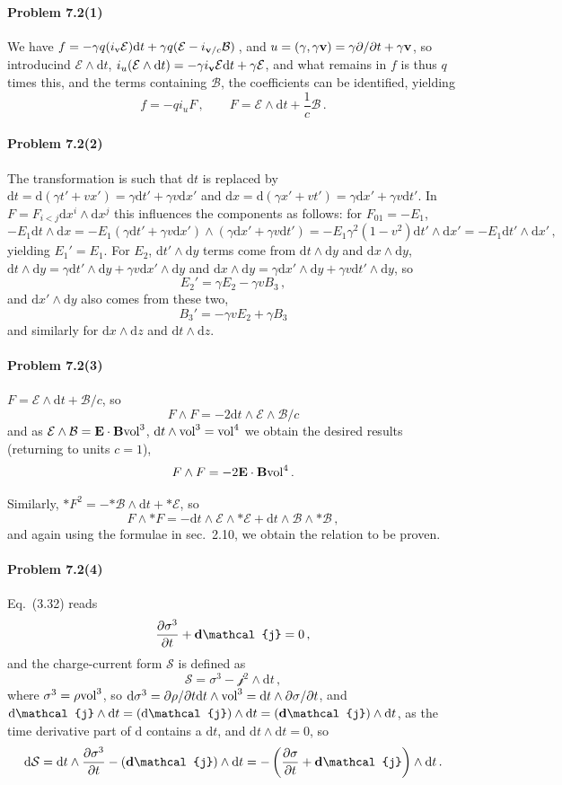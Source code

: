 \documentclass[a4paper,12pt]{article}
\def\d{\mathrm{d}}
\newcommand{\problem}[1]{\paragraph{Problem #1}}
\begin{document}
\problem{7.2(1)} We have $f=-\gamma q (i_{\rm v}\mathcal{E})\d t+ \gamma q(\mathcal{E}-i_{{\bf v}/c}\mathcal{B})$\,,
and $u=(\gamma, \gamma {\bf v}) = \gamma \partial/\partial t+\gamma {\bf v}$, so introducind $\mathcal{E}\wedge\d t$, $i_{u}(\mathcal{E}\wedge\d t) = -\gamma i_{\bf v}\mathcal{E} \d t+ \gamma \mathcal{E}$, and what remains in $f$ is thus $q$ times this, and the terms containing $\mathcal{B}$, the coefficients can be identified, yielding
\[
 f=-qi_u F\,,\quad\quad F=\mathcal{E}\wedge \d t+\frac{1}{c}\mathcal{B}\,.
\]


\problem{7.2(2)} The transformation is such that $\d t$ is replaced by $\d t  =\d(\gamma t'+v x') = \gamma \d t' + \gamma v \d x'$ and $\d x = \d(\gamma x'+v t') = \gamma \d x' + \gamma v \d t'$. In $F=F_{i<j}\d x^i \wedge \d x^j$ this influences the components as follows: for $F_{01}=-E_1$,
\[
 -E_1\d t \wedge \d x = -E_1 (\gamma\d t'+\gamma v\d x')\wedge (\gamma\d x'+\gamma v \d t')=-E_1\gamma^2(1-v^2)\d t'\wedge \d x' =-E_1 \d t'\wedge \d x'\,,
\]
yielding $E_1'=E_1$. For $E_2$, $\d t'\wedge \d y$ terms come from $\d t\wedge \d y$ and $\d x\wedge \d y$, $\d t\wedge \d y =\gamma \d t'\wedge \d y + \gamma v\d x'\wedge \d y$ and $\d x\wedge \d y = \gamma \d x ' \wedge \d y + \gamma v \d t'\wedge \d y$, so
\[
 E_2' = \gamma E_2 -\gamma v B_3\,,
\]
and $\d x'\wedge \d y$ also comes from these two,
\[
 B_3' = -\gamma v E_2 + \gamma B_3
\]
and similarly for $\d x\wedge \d z$ and $\d t\wedge \d z$.


\problem{7.2(3)} $F=\mathcal{E}\wedge \d t+\mathcal{B}/c$, so
\[
 F\wedge F = -2\d t\wedge \mathcal{E}\wedge \mathcal{B}/c 
\]
and as $\mathcal{E} \wedge \mathcal{B} = {\bf E}\cdot{\bf B}{\rm vol}^3$, $\d t\wedge {\rm vol}^3={\rm vol}^4$ we obtain the desired results (returning to units $c=1$),
\[
 F\wedge F = -2 {\bf E}\cdot{\bf B}{\rm vol}^4\,.
\]

Similarly, $*F^2 = -\boldsymbol{*}\mathcal{B}\wedge \d t+\boldsymbol{*}\mathcal{E}$, so
\[
 F\wedge *F = -\d t\wedge\mathcal{E}\wedge\boldsymbol{*}\mathcal{E}+\d t\wedge\mathcal{B}\wedge \boldsymbol{*}\mathcal{B}\,,
\]
and again using the formulae in sec.\ 2.10, we obtain the relation to be proven.


\problem{7.2(4)} Eq.\ (3.32) reads
\[
 \frac{\partial\sigma^3}{\partial t}+{\bf d}\mathcal{j}= 0\,,
\]
and the charge-current form $\mathcal{S}$ is defined as
\[
 \mathcal{S} = \sigma^3 -\mathcal{j}^2\wedge\d t\,,
\]
where $\sigma^3=\rho {\rm vol}^3$, so $\d\sigma^3=\partial\rho/\partial t \d t \wedge {\rm vol}^3 = \d t\wedge \partial \sigma/\partial t$, and $\d\mathcal{j}\wedge \d t = (\d\mathcal{j})\wedge \d t = ({\bf d}\mathcal{j})\wedge \d t$, as the time derivative part of $\d$ contains a $\d t$, and $\d t\wedge\d t=0$, so
\[
 \d \mathcal{S} = \d t\wedge \frac{\partial\sigma^3}{\partial t}-({\bf d}\mathcal{j})\wedge \d t = -\left(\frac{\partial\sigma}{\partial t}+{\bf d}\mathcal{j}\right)\wedge \d t\,.
\]
\end{document}
